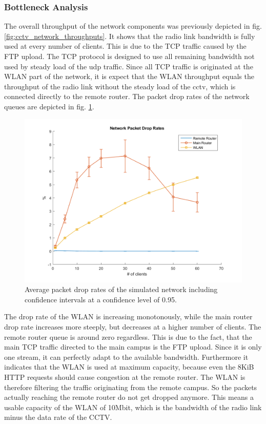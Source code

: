 \documentclass[
10pt, %
a4paper, %
oneside, %
headinclude,footinclude, %
BCOR5mm, %
]{scrartcl}
\begin{document}
\subsubsection{Bottleneck Analysis}
The overall throughput of the network components was previously depicted in fig. \ref{fig:cctv_network_throughputs}. It shows that the radio link bandwidth is fully used at every number of clients. This is due to the TCP traffic caused by the FTP upload. The TCP protocol is designed to use all remaining bandwidth not used by steady load of the udp traffic. Since all TCP traffic is originated at the WLAN part of the network, it is expect that the WLAN throughput equals the throughput of the radio link without the steady load of the cctv, which is connected directly to the remote router.
The packet drop rates of the network queues are depicted in fig. \ref{fig:cctv_netw_packet_drop_rates}.
\begin{figure}[!ht]
  \centering
  \includegraphics[width=\textwidth]{Figures/cctv/Network_Packet_Drop_Rates.png}
  \caption{Average packet drop rates of the simulated network including confidence intervals at a confidence level of 0.95.} \label{fig:cctv_netw_packet_drop_rates}
\end{figure}

The drop rate of the WLAN is increasing monotonously, while the main router drop rate increases more steeply, but decreases at a higher number of clients. The remote router queue is around zero regardless. This is due to the fact, that the main TCP traffic directed to the main campus is the FTP upload. Since it is only one stream, it can perfectly adapt to the available bandwidth. Furthermore it indicates that the WLAN is used at maximum capacity, because even the 8KiB HTTP requests should cause congestion at the remote router. The WLAN is therefore filtering the traffic originating from the remote campus. So the packets actually reaching the remote router do not get dropped anymore. This means a usable capacity of the WLAN of 10Mbit, which is the bandwidth of the radio link minus the data rate of the CCTV.
\end{document}
